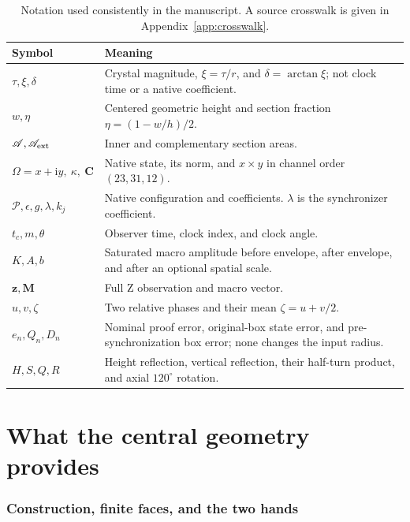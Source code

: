\documentclass[11pt,a4paper]{article}
\numberwithin{equation}{section}
\newcommand{\ii}{\mathrm i}
\newcommand{\zobs}{\mathbf z}
\newcommand{\macro}{\mathbf M}
\newcommand{\chiral}{\mathbf C}
\newcommand{\Params}{\mathcal P}
\begin{document}
\begin{table}[htbp]
\centering\small
\begin{tabular}{@{}p{}p{}@{}}
\toprule
Symbol & Meaning\\ \midrule
$\tau,\xi,\delta$ & Crystal magnitude, $\xi=\tau/r$, and $\delta=\arctan\xi$;
not clock time or a native coefficient.\\
$w,\eta$ & Centered geometric height and section fraction
$\eta=(1-w/h)/2$.\\
$\mathscr A,\mathscr A_{\rm ext}$ & Inner and complementary section areas.\\
$\Omega=x+\ii y,\ \kappa,\ \chiral$ & Native state, its norm, and
$x\times y$ in channel order $(23,31,12)$.\\
$\Params,\epsilon,g,\lambda,k_j$ & Native configuration and coefficients.
$\lambda$ is the synchronizer coefficient.\\
$t_c,m,\theta$ & Observer time, clock index, and clock angle.\\
$K,A,b$ & Saturated macro amplitude before envelope, after envelope,
and after an optional spatial scale.\\
$\zobs,\macro$ & Full Z observation and macro vector.\\
$u,v,\zeta$ & Two relative phases and their mean $\zeta=u+v/2$.\\
$e_n,Q_n,D_n$ & Nominal proof error, original-box state error, and
pre-synchronization box error; none changes the input radius.\\
$H,S,Q,R$ & Height reflection, vertical reflection, their half-turn
product, and axial $120^\circ$ rotation.\\
\bottomrule
\end{tabular}
\caption{Notation used consistently in the manuscript. A source crosswalk is
given in Appendix~\ref{app:crosswalk}.}
\end{table}

\part{What the central geometry provides}

\section{Construction, finite faces, and the two hands}\label{sec:geometry}
\end{document}
